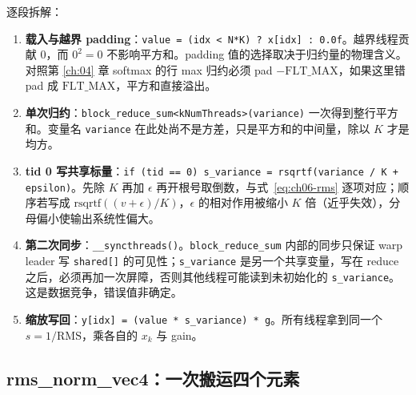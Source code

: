 逐段拆解：
\begin{enumerate}
  \item \textbf{载入与越界 padding}：\texttt{value = (idx < N*K) ? x[idx] : 0.0f}。越界线程贡献 $0$，而 $0^2 = 0$ 不影响平方和。padding 值的选择取决于归约量的物理含义。对照第 \ref{ch:04} 章 softmax 的行 max 归约必须 pad $-\mathrm{FLT\_MAX}$，如果这里错 pad 成 $\mathrm{FLT\_MAX}$，平方和直接溢出。
  \item \textbf{单次归约}：\texttt{block\_\allowbreak{}reduce\_\allowbreak{}sum\allowbreak{}<k\allowbreak{}Num\allowbreak{}Threads>\allowbreak{}(variance)} 一次得到整行平方和。变量名 \texttt{variance} 在此处尚不是方差，只是平方和的中间量，除以 $K$ 才是均方。
  \item \textbf{tid 0 写共享标量}：\texttt{if \allowbreak{}(tid =\allowbreak{}=\allowbreak{} 0) s\_\allowbreak{}variance =\allowbreak{} rsqrtf\allowbreak{}(variance /\allowbreak{} K + epsilon)}。先除 $K$ 再加 $\epsilon$ 再开根号取倒数，与式~\eqref{eq:ch06-rms} 逐项对应；顺序若写成 $\mathrm{rsqrtf}((v + \epsilon)/K)$，$\epsilon$ 的相对作用被缩小 $K$ 倍（近乎失效），分母偏小使输出系统性偏大。
  \item \textbf{第二次同步}：\texttt{\_\allowbreak{}\_\allowbreak{}syncthreads\allowbreak{}()}。\texttt{block\_\allowbreak{}reduce\_\allowbreak{}sum} 内部的同步只保证 warp leader 写 \texttt{shared[]} 的可见性；\texttt{s\_variance} 是另一个共享变量，写在 reduce 之后，必须再加一次屏障，否则其他线程可能读到未初始化的 \texttt{s\_variance}。这是数据竞争，错误值非确定。
  \item \textbf{缩放写回}：\texttt{y[idx] = (value * s\_variance) * g}。所有线程拿到同一个 $s = 1/\mathrm{RMS}$，乘各自的 $x_k$ 与 gain。
\end{enumerate}

\subsection{rms\_norm\_vec4：一次搬运四个元素}



